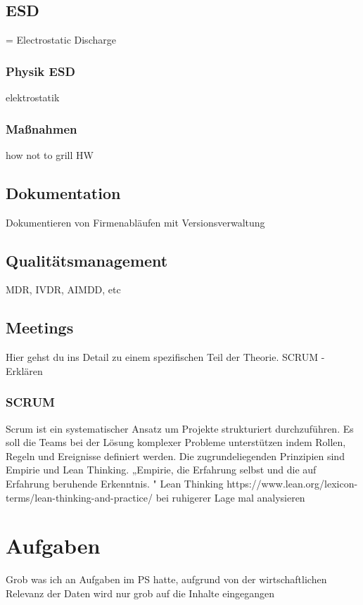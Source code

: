 \documentclass[a4paper, 12pt]{article}
\begin{document}
\subsection{ESD}\label{ESD}
= Electrostatic Discharge

\subsubsection{Physik ESD}\label{physik_esd}
elektrostatik

\subsubsection{Maßnahmen}\label{measurements_esd}
how not to grill HW

\subsection{Dokumentation}\label{Dokumentation}
Dokumentieren von Firmenabläufen mit Versionsverwaltung

\subsection{Qualitätsmanagement}\label{Qualitätsmanagement}
MDR, IVDR, AIMDD, etc


\subsection{Meetings}\label{Meetings}
Hier gehst du ins Detail zu einem spezifischen Teil der Theorie.
SCRUM - Erklären

\subsubsection{SCRUM}\label{SCRUM}
Scrum ist ein systematischer Ansatz um Projekte strukturiert durchzuführen. Es soll die Teams bei der Lösung komplexer Probleme unterstützen indem Rollen, Regeln und Ereignisse definiert werden. Die zugrundeliegenden Prinzipien sind Empirie und Lean Thinking. 
„Empirie, die Erfahrung selbst und die auf Erfahrung beruhende Erkenntnis.  
 \cite{dorsch_empirie}"
 Lean Thinking https://www.lean.org/lexicon-terms/lean-thinking-and-practice/
 bei ruhigerer Lage mal analysieren %
 

\cite{scrum2020}


\newpage
\section{Aufgaben}\label{Aufgaben}
Grob was ich an Aufgaben im PS hatte, aufgrund von der wirtschaftlichen Relevanz der Daten wird nur grob auf die Inhalte eingegangen
\end{document}
